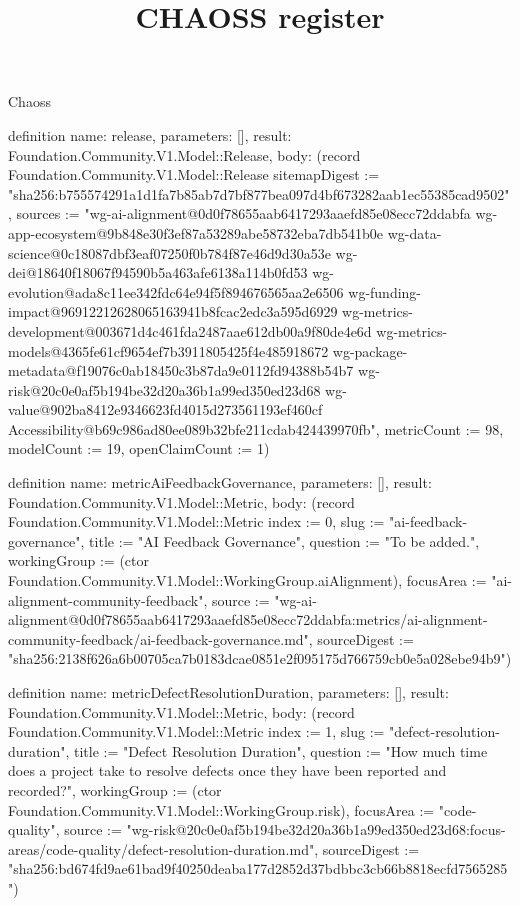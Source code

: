 \begin{lexlean}{Chaoss}
\title{CHAOSS register}
\begin{semanticmodule}
definition{
  name: release,
  parameters: [],
  result: Foundation.Community.V1.Model::Release,
  body: (record Foundation.Community.V1.Model::Release {sitemapDigest := "sha256:b755574291a1d1fa7b85ab7d7bf877bea097d4bf673282aab1ec55385cad9502", sources := "wg-ai-alignment@0d0f78655aab6417293aaefd85e08ecc72ddabfa wg-app-ecosystem@9b848e30f3ef87a53289abe58732eba7db541b0e wg-data-science@0c18087dbf3eaf07250f0b784f87e46d9d30a53e wg-dei@18640f18067f94590b5a463afe6138a114b0fd53 wg-evolution@ada8c11ee342fdc64e94f5f894676565aa2e6506 wg-funding-impact@96912212628065163941b8fcac2edc3a595d6929 wg-metrics-development@003671d4c461fda2487aae612db00a9f80de4e6d wg-metrics-models@4365fe61cf9654ef7b3911805425f4e485918672 wg-package-metadata@f19076c0ab18450c3b87da9e0112fd94388b54b7 wg-risk@20c0e0af5b194be32d20a36b1a99ed350ed23d68 wg-value@902ba8412e9346623fd4015d273561193ef460cf Accessibility@b69c986ad80ee089b32bfe211cdab424439970fb", metricCount := 98, modelCount := 19, openClaimCount := 1})
}

definition{
  name: metricAiFeedbackGovernance,
  parameters: [],
  result: Foundation.Community.V1.Model::Metric,
  body: (record Foundation.Community.V1.Model::Metric {index := 0, slug := "ai-feedback-governance", title := "AI Feedback Governance", question := "To be added.", workingGroup := (ctor Foundation.Community.V1.Model::WorkingGroup.aiAlignment), focusArea := "ai-alignment-community-feedback", source := "wg-ai-alignment@0d0f78655aab6417293aaefd85e08ecc72ddabfa:metrics/ai-alignment-community-feedback/ai-feedback-governance.md", sourceDigest := "sha256:2138f626a6b00705ca7b0183dcae0851e2f095175d766759cb0e5a028ebe94b9"})
}

definition{
  name: metricDefectResolutionDuration,
  parameters: [],
  result: Foundation.Community.V1.Model::Metric,
  body: (record Foundation.Community.V1.Model::Metric {index := 1, slug := "defect-resolution-duration", title := "Defect Resolution Duration", question := "How much time does a project take to resolve defects once they have been reported and recorded?", workingGroup := (ctor Foundation.Community.V1.Model::WorkingGroup.risk), focusArea := "code-quality", source := "wg-risk@20c0e0af5b194be32d20a36b1a99ed350ed23d68:focus-areas/code-quality/defect-resolution-duration.md", sourceDigest := "sha256:bd674fd9ae61bad9f40250deaba177d2852d37bdbbc3cb66b8818ecfd7565285"})
}


\end{semanticmodule}
\end{lexlean}
